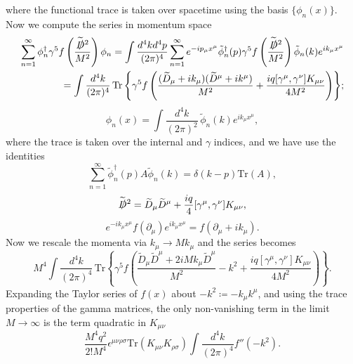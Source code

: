 \documentclass[11pt, a4paper]{article}
\begin{document}
where the functional trace is taken over spacetime using the basis $\{ \phi_n(x) \}$.
Now we compute the series in momentum space
\begin{equation}
  \begin{split}
  \sum_{n = 1}^{\infty}{\phi_n^\dagger\gamma^5
  f\left( \frac{\widetilde{\slashed{D}}{}^2 }{M^2} \right)\phi_n} =
  \int{\frac{d^4k d^4p}{(2\pi)^4} \sum_{n=1}^{\infty}{ e^{-ip_\mu x^\mu}\tilde{\phi}_n^\dagger(p)
      \gamma^5 f\left( \frac{ \widetilde{\slashed{D}}{}^2 }{M^2}\right) \tilde{\phi}_n(k)
  e^{ik_\mu x^\mu} } } \\
  =  \int{\frac{d^4k}{(2\pi)^4}\, \mathrm{Tr}\left\{
      \gamma^5 f\left( \frac{(\widetilde{D}_\mu +ik_\mu)(\widetilde{D}^\mu +ik^\mu)}{M^2}
        + \frac{iq [\gamma^\mu,\gamma^\nu ]K_{\mu\nu} }{4M^2} \right)  \right\} };
      \end{split}
\end{equation}
\begin{equation}
  \phi_n(x) = \int{\frac{d^4k}{(2\pi)^2}\,\tilde{\phi}_n(k)e^{ik_\mu x^\mu}   },
\end{equation}
where the trace is taken over the internal and $\gamma$ indices, and we have use the identities
\begin{equation}
  \sum_{n = 1}^{\infty}{\tilde{\phi}_n^\dagger(p) A \tilde{\phi}_n(k)} =
  \delta(k-p) \mathrm{Tr}(A),
\end{equation}
\begin{equation}
  \widetilde{\slashed{D}}{}^2 = \widetilde{D}_\mu \widetilde{D}^\mu
  + \frac{iq}{4}[\gamma^\mu, \gamma^\nu]K_{\mu\nu},
\end{equation}
\begin{equation}
  e^{-ik_\mu x^\mu}f(\partial_\mu)e^{ik_\mu x^\mu} = f(\partial_\mu +ik_\mu).
\end{equation}
Now we rescale the momenta via $k_\mu \rightarrow Mk_\mu$ and the series becomes
\begin{equation}
  M^4 \int{\frac{d^4k}{(2\pi)^4}\, \mathrm{Tr}\left\{
      \gamma^5 f\left( \frac{ \widetilde{D}_\mu \widetilde{D}^\mu
        + 2iMk_\mu \widetilde{D}^\mu}{M^2} -k^2
        + \frac{iq [\gamma^\mu,\gamma^\nu ]K_{\mu\nu} }{4M^2} \right)  \right\} }. 
\end{equation}
Expanding the Taylor series of $f(x)$ about $-k^2 \coloneq - k_\mu k^\mu$, and using the trace 
properties of the gamma matrices, the only non-vanishing term in
the limit $M \rightarrow \infty$ is the term quadratic in $K_{\mu\nu}$ 
\begin{equation}
  \frac{M^4q^2}{2!M^4}\epsilon^{\mu\nu\rho\sigma}\mathrm{Tr}(K_{\mu\nu}K_{\rho\sigma})
  \int{\frac{d^4k}{(2\pi)^4}f''(-k^2) }.
\end{equation}
\end{document}
